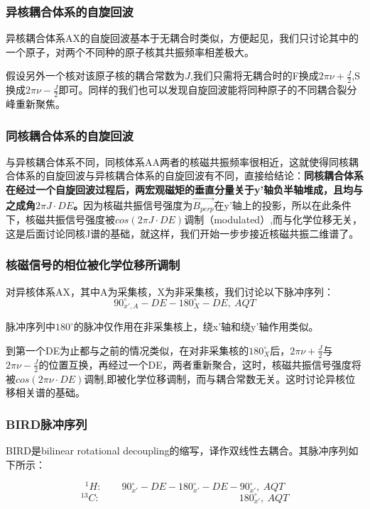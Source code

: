 \subsubsection{异核耦合体系的自旋回波} 

异核耦合体系AX的自旋回波基本于无耦合时类似，方便起见，我们只讨论其中的一个原子，对两个不同种的原子核其共振频率相差极大。

假设另外一个核对该原子核的耦合常数为$J$,我们只需将无耦合时的F换成$2 \pi \nu + \frac{J}{2}$,S换成$2\pi \nu - \frac{J}{2}$即可。同样的我们也可以发现自旋回波能将同种原子的不同耦合裂分峰重新聚焦。

\subsubsection{同核耦合体系的自旋回波} 

与异核耦合体系不同，同核体系AA两者的核磁共振频率很相近，这就使得同核耦合体系的自旋回波与异核耦合体系的自旋回波有不同，直接给结论：\textbf{同核耦合体系在经过一个自旋回波过程后，两宏观磁矩的垂直分量关于y'轴负半轴堆成，且均与之成角$2 \pi J \cdot DE$。}因为核磁共振信号强度为$\overrightarrow{B_{perp}}$在y'轴上的投影，所以在此条件下，核磁共振信号强度被$cos(2 \pi J \cdot DE)$调制（modulated）,而与化学位移无关，这是后面讨论同核J谱的基础，就这样，我们开始一步步接近核磁共振二维谱了。

\subsubsection{核磁信号的相位被化学位移所调制} 

对异核体系AX，其中A为采集核，X为非采集核，我们讨论以下脉冲序列：
\[90^{\circ}_{x',A}-DE-180^{\circ}_{X}-DE, \ AQT\]

脉冲序列中$180^{\circ}$的脉冲仅作用在非采集核上，绕x'轴和绕y'轴作用类似。

到第一个DE为止都与之前的情况类似，在对非采集核的$180^{\circ}_{X}$后，$2 \pi \nu + \frac{J}{2}$与$2 \pi \nu - \frac{J}{2}$的位置互换，再经过一个DE，两者重新聚合，这时，核磁共振信号强度将被$cos(2 \pi \nu \cdot DE)$调制,即被化学位移调制，而与耦合常数无关。这时讨论异核位移相关谱的基础。

\subsubsection{BIRD脉冲序列} 

BIRD是bilinear rotational decoupling的缩写，译作双线性去耦合。其脉冲序列如下所示：

\[^1H: \qquad 90^{\circ}_{x'}-DE-180^{\circ}_{x'}-DE-90^{\circ}_{x'}, \ AQT\]
\[^{13}C: \qquad \qquad  \qquad \qquad \qquad \qquad \qquad 180^{\circ}_{x'}, \ AQT\]

